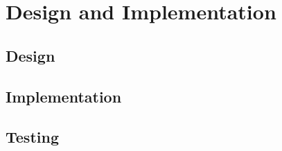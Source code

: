 \chapter{Design and Implementation}
\label{chapter:related}


\section{Design}
\label{sec:design}


\section{Implementation}
\label{sec:implementation}


\section{Testing}
\label{sec:testing}
